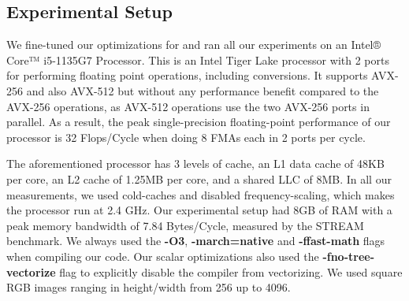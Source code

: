 \documentclass[letterpaper]{article}
\newcommand{\mypar}[1]{{\bf #1.}}
\begin{document}

\subsection{Experimental Setup} We fine-tuned our optimizations for and ran all our experiments on an Intel® Core™ i5-1135G7 Processor. This is an Intel Tiger Lake processor with 2 ports for performing floating point operations, including conversions. It supports AVX-256 and also AVX-512 but without any performance benefit compared to the AVX-256 operations, as AVX-512 operations use the two AVX-256 ports in parallel. As a result, the peak single-precision floating-point performance of our processor is 32 Flops/Cycle when doing 8 FMAs each in 2 ports per cycle.

The aforementioned processor has 3 levels of cache, an L1 data cache of 48KB per core, an L2 cache of 1.25MB per core, and a shared LLC of 8MB. In all our measurements, we used cold-caches and disabled frequency-scaling, which makes the processor run at 2.4 GHz. Our experimental setup had 8GB of RAM with a peak memory bandwidth of 7.84 Bytes/Cycle, measured by the STREAM~\cite{McCalpin:95} benchmark. We always used the \textbf{-O3}, \textbf{-march=native} and \textbf{-ffast-math} flags when compiling our code. Our scalar optimizations also used the \textbf{-fno-tree-vectorize} flag to explicitly disable the compiler from vectorizing. We used square RGB images ranging in height/width from 256 up to 4096.


\end{document}
